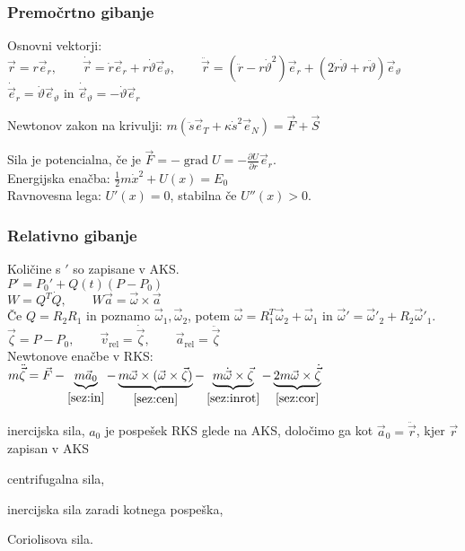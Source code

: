 \documentclass[a4paper,10pt]{article}
\title{\mytitle}
\author{Jure Slak}
\date{\today}
\theoremstyle{definition}
\newenvironment{enumerate*}%
{
  \vspace{-6pt}
  \begin{enumerate}[(1)]
    \setlength{\itemsep}{0pt}
    \setlength{\parskip}{2pt}
}{\end{enumerate}}
\DeclareMathOperator{\grad}{grad}
\let\theta\vartheta
\newcommand{\vzeta}{\vec{\zeta}}
\newcommand{\dzeta}{\dot{\vzeta}}
\newcommand{\ddzeta}{\ddot{\vzeta}}
\newcommand{\vomega}{\vec{\omega}}
\newcommand{\domega}{\dot{\vomega}}
\newcommand{\va}{\vec{a}}
\newcommand{\vr}{\vec{r}}
\newcommand{\dr}{\dot{\vr}}
\newcommand{\ddr}{\ddot{\vr}}
\newcommand{\er}{\vec{e}_r}
\newcommand{\eq}{\vec{e}_{\theta}}
\begin{document}
\subsubsection*{Premočrtno gibanje}
Osnovni vektorji: $\vr = r\er, \qquad \dr = \dot{r}\er + r\dot{\theta}\eq,
\qquad \ddr = (\ddot{r} - r\dot{\theta}^2)\er + (2\dot{r}\dot{\theta} +
r\ddot{\theta})\eq$ \\
$\dot{\vec{e}}_r = \dot{\theta} \eq$ in $\dot{\vec{e}}_{\theta} = - \dot{\theta} \er$

Newtonov zakon na krivulji: $m(\ddot{s}\vec{e}_T + \kappa\dot{s}^2\vec{e}_N)
= \vec{F} + \vec{S}$

Sila je potencialna, če je $\vec{F} = -\grad U = - \frac{\partial U}{\partial
r}\er$. \\
Energijska enačba: $\frac12m\dot{x}^2 + U(x) = E_0$ \\
Ravnovesna lega: $U'(x) = 0$, stabilna če $U''(x) > 0$.

\subsubsection*{Relativno gibanje}
Količine s $'$ so zapisane v AKS. \\
$P' = P_0' + Q(t)(P-P_0)$ \\
$W = Q^T\dot{Q}, \qquad  W\va = \vomega \times \va$ \\
Če $Q=R_2R_1$ in poznamo $\vomega_1,\vomega_2$, potem $\vomega=R_1^T\vomega_2+\vomega_1$ in $\vomega' = \vomega'_2+R_2\vomega'_1$.\\
$\vzeta = P - P_0, \qquad \vec{v}_{\operatorname{rel}} = \dzeta, \qquad \va_{\operatorname{rel}} =
\ddzeta$
\\
Newtonove enačbe v RKS: \\[6pt]
$m\ddzeta = \vec{F} -
\underbrace{m\va_0}_{\eqref{sez:in}} -
\underbrace{m\vomega \times (\vomega \times \vzeta)}_{\eqref{sez:cen}} -
\underbrace{m\domega\times\vzeta}_{\eqref{sez:inrot}} -
\underbrace{2m\vomega\times\dzeta}_{\eqref{sez:cor}}$

\begin{enumerate*}
  \item inercijska sila, $a_0$ je pospešek RKS glede na AKS,  določimo ga kot
    $\vec{a}_0 = \ddot{\vec{r}}$, kjer $\vec{r}$ zapisan v AKS \label{sez:in}
  \item centrifugalna sila,                                   \label{sez:cen}
  \item inercijska sila zaradi kotnega pospeška,              \label{sez:inrot}
  \item Coriolisova sila.                                     \label{sez:cor}
\end{enumerate*}
\end{document}
